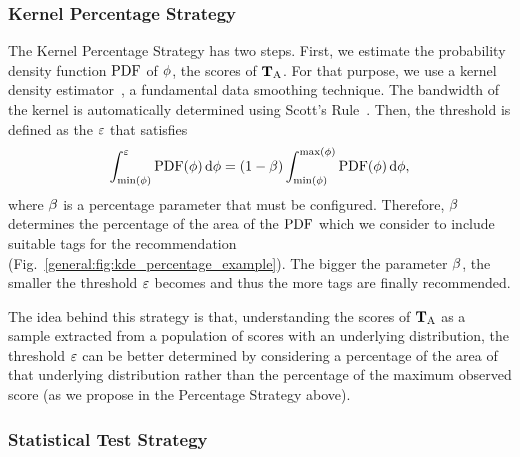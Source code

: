 \subsubsection{Kernel Percentage Strategy}

The Kernel Percentage Strategy has two steps. First, we estimate the probability density function $\text{PDF}$ of $\phi$, the scores of $\mathbf{T}_{\text{A}}$. For that purpose, we use a kernel density estimator~\citep{silverman1986}, a fundamental data smoothing technique. The bandwidth of the kernel is automatically determined using Scott's Rule~\citep{scott2008}. Then, the threshold is defined as the $\varepsilon$ that satisfies
\begin{equation}
  \int_{\text{min}(\phi)}^\varepsilon \text{PDF}(\phi)\,\text{d}\phi = (1 - \beta) \int_{\text{min}(\phi)}^{\text{max}(\phi)} \text{PDF}(\phi)\,\text{d}\phi ,
\end{equation}
where $\beta$ is a percentage parameter that must be configured. Therefore, $\beta$ determines the percentage of the area of the $\text{PDF}$ which we consider to include suitable tags for the recommendation (Fig.~\ref{general:fig:kde_percentage_example}). The bigger the parameter $\beta$, the smaller the threshold $\varepsilon$ becomes and thus the more tags are finally recommended.

The idea behind this strategy is that, understanding the scores of $\mathbf{T}_{\text{A}}$ as a sample extracted from a population of scores with an underlying distribution, the threshold $\varepsilon$ can be better determined by considering a percentage of the area of that underlying distribution rather than the percentage of the maximum observed score (as we propose in the Percentage Strategy above).


\subsubsection{Statistical Test Strategy}


